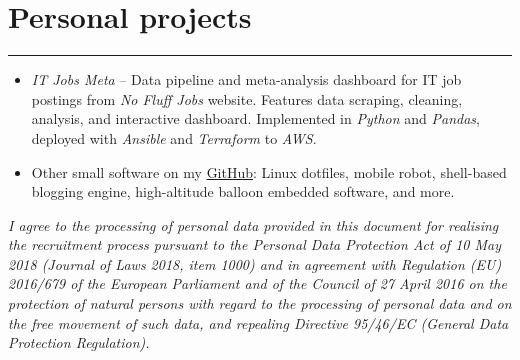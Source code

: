 \documentclass{article}
\begin{document}
\section*{Personal projects}
\hrule \medskip
\begin{itemize}
	\item \textit{IT Jobs Meta} -- Data pipeline and meta-analysis
		dashboard for IT job postings from \textit{No Fluff Jobs} website.
		Features data scraping, cleaning, analysis, and interactive dashboard.
		Implemented in \textit{Python} and \textit{Pandas}, deployed with
		\textit{Ansible} and \textit{Terraform} to \textit{AWS}.
	\item Other small software on my \href{https://github.com/maciejzj}{GitHub}:
		Linux dotfiles, mobile robot, shell-based blogging engine, high-altitude
		balloon embedded software, and more.
\end{itemize}

\vfill
\tiny{
\textit{I agree to the processing of personal data provided in this document for
realising the recruitment process pursuant to the Personal Data Protection Act
of 10 May 2018 (Journal of Laws 2018, item 1000) and in agreement with
Regulation (EU) 2016/679 of the European Parliament and of the Council of 27
April 2016 on the protection of natural persons with regard to the processing of
personal data and on the free movement of such data, and repealing Directive
95/46/EC (General Data Protection Regulation).}
}
\end{document}
